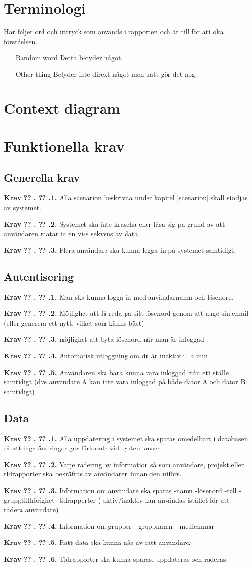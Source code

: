 \documentclass[a4paper]{article}
\newcommand\getcurrentref[1]{%
 \ifnumequal{\value{#1}}{0}
  {??}
  {\the\value{#1}}%
}
\newcommand\requirement[2]{
	\numberedrow{Krav}{#1}{#2}
}
\newcommand\numberedrow[3]{
	\noindent
	\textbf{#1 \getcurrentref{section}.\getcurrentref{subsection}.#2.} #3
	
}
\begin{document}
\section{Terminologi}
Här följer ord och uttryck som används i rapporten och är till för att öka förståelsen.
\begin{itemize}
\item [Random word] Detta betyder något.
\item [Other thing] Betyder inte direkt något men nått gör det nog.
\end{itemize}
\section{Context diagram}
\section{Funktionella krav}
\subsection{Generella krav}
 \requirement{1}{Alla scenarion beskrivna under kapitel \ref{scenarion} skall stödjas av systemet.}
 \requirement{2}{Systemet ska inte krascha eller låsa sig på grund av att användaren matar in en viss sekvens av data.}
 \requirement{3}{Flera användare ska kunna logga in på systemet samtidigt.}
 
\subsection{Autentisering}
\requirement{1}{Man ska kunna logga in med användarnamn och lösenord.}
\requirement{2}{Möjlighet att få reda på sitt lösenord genom att ange sin email (eller generera ett nytt, vilket som känns bäst)}
\requirement{3}{möjlighet att byta lösenord när man är inloggad}
\requirement{4}{Automatisk utloggning om du är inaktiv i 15 min}
\requirement{5}{Användaren ska bara kunna vara inloggad från ett ställe samtidigt (dvs användare A kan inte vara inloggad på både dator A och dator B samtidigt)}

\subsection{Data}
\requirement{1}{Alla uppdatering i systemet ska sparas omedelbart i databasen så att inga ändringar går förlorade vid systemkrasch.}
\requirement{2}{Varje radering av information så som användare, projekt eller tidrapporter ska bekräftas av användaren innan den utförs.}
\requirement{3}{Information om användare ska sparas 
-namn
-lösenord
-roll
-grupptillhörighet
-tidrapporter
(-aktiv/inaktiv kan användas istället för att radera användare)}
\requirement{4}{Information om grupper
- gruppnamn
- medlemmar}
\requirement{5}{Rätt data ska kunna nås av rätt användare.}
\requirement{6}{Tidrapporter ska kunna sparas, uppdateras och raderas.}
\end{document}
